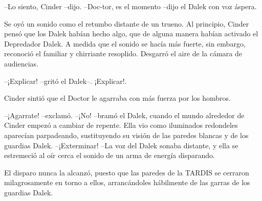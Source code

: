 --Lo siento, Cinder --dijo.
--Doc-tor, es el momento --dijo el Dalek con voz áspera.

Se oyó un sonido como el retumbo distante de un trueno. Al principio, Cinder pensó que los Dalek habían hecho algo, que de alguna manera habían activado el Depredador Dalek. A medida que el sonido se hacía más fuerte, sin embargo, reconoció el familiar y chirriante resoplido. Desgarró el aire de la cámara de audiencias.

--¡Explicar! --gritó el Dalek--. ¡Explicar!.

Cinder sintió que el Doctor le agarraba con más fuerza por los hombros. 

--¡Agarrate! --exclamó.
--¡No! --bramó el Dalek, cuando el mundo alrededor de Cinder empezó a cambiar de repente. Ella vio como iluminados redondeles aparecían parpadeando, sustituyendo su visión de las paredes blancas y de los guardias Dalek.
--¡Exterminar! --La voz del Dalek sonaba distante, y ella se estremeció al oír cerca el sonido de un arma de energía disparando.

El disparo nunca la alcanzó, puesto que las paredes de la TARDIS se cerraron milagrosamente en torno a ellos, arrancándoles hábilmente de las garras de los guardias Dalek.

